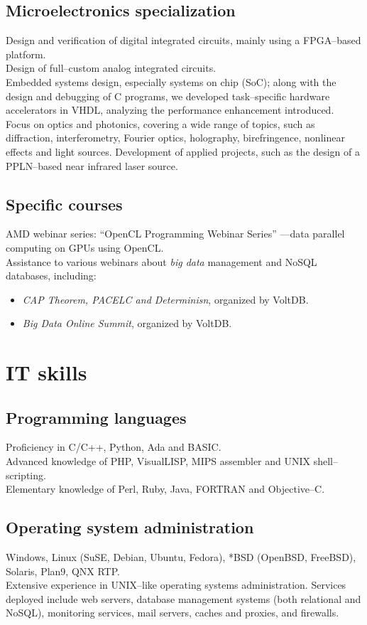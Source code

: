 \documentclass[11pt, a4paper]{article}
\newcommand{\years}[1]{\marginnote{\scriptsize #1}}
\begin{document}
\subsection*{Microelectronics specialization}
\noindent
\years{2008--2010}Design and verification of digital integrated circuits, mainly using a FPGA--based platform.\\
Design of full--custom analog integrated circuits.\\
Embedded systems design, especially systems on chip (SoC); along with the design and debugging of C programs, we developed task--specific hardware accelerators in VHDL, analyzing the performance enhancement introduced.\\
Focus on optics and photonics, covering a wide range of topics, such as diffraction, interferometry, Fourier optics, holography, birefringence, nonlinear effects and light sources. Development of applied projects, such as the design of a PPLN--based near infrared laser source.

\subsection*{Specific courses}
\noindent
\years{2010}AMD webinar series: ``OpenCL Programming Webinar Series'' ---data parallel computing on GPUs using OpenCL.\\
\years{2011}Assistance to various webinars about \textit{big data} management and NoSQL databases, including:
\begin{itemize}
	\item  \emph{CAP Theorem, PACELC and Determinisn}, organized by VoltDB.
	\item  \emph{Big Data Online Summit}, organized by VoltDB.
\end{itemize}


\section*{IT skills} %
\subsection*{Programming languages}
\noindent
	Proficiency in C/C++, Python, Ada and BASIC.\\
	Advanced knowledge of PHP, VisualLISP, MIPS assembler and UNIX shell--scripting.\\
	Elementary knowledge of Perl, Ruby, Java, FORTRAN and Objective--C.
\subsection*{Operating system administration}
\noindent
	Windows, Linux (SuSE, Debian, Ubuntu, Fedora), *BSD (OpenBSD, FreeBSD), Solaris, Plan9, QNX RTP.\\
	Extensive experience in UNIX--like operating systems administration. Services deployed include web servers, database management systems (both relational and NoSQL), monitoring services, mail servers, caches and proxies, and firewalls.
\end{document}
